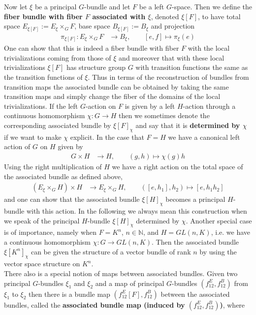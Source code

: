 Now let $\xi$ be a principal $G$-bundle and let $F$ be a left $G$-space. Then we define the \textbf{fiber bundle with fiber $F$ associated with $\xi$}, denoted $\xi[F]$, to have total space $E_{\xi[F]} := E_{\xi} \times_{G} F$, base space $B_{\xi[F]} := B_{\xi}$ and projection
\begin{align*}
  \pi_{\xi[F]}
  \colon
  E_{\xi} \times_{G} F
  &\to
  B_{\xi}
  ,\qquad
  [e,f]
  \mapsto
  \pi_{\xi}(e)
\end{align*}
One can show that this is indeed a fiber bundle with fiber $F$ with the local trivializations coming from those of $\xi$ and moreover that with these local trivializations $\xi[F]$ has structure group $G$ with transition functions the same as the transition functions of $\xi$. Thus in terms of the reconstruction of bundles from transition maps the associated bundle can be obtained by taking the same transition maps and simply change the fiber of the domains of the local trivializations. If the left $G$-action on $F$ is given by a left $H$-action through a continuous homomorphism $\chi \colon G \to H$ then we sometimes denote the corresponding associated bundle by $\xi[F]_{\chi}$ and say that it is \textbf{determined by $\chi$} if we want to make $\chi$ explicit. In the case that $F = H$ we have a canonical left action of $G$ on $H$ given by
\begin{align*}
  G \times H
  &\to
  H
  ,\qquad
  (g,h)
  \mapsto
  \chi(g)h
\end{align*}
Using the right multiplication of $H$ we have a right action on the total space of the associated bundle as defined above,
\begin{align*}
  (E_{\xi}  \times_{G} H)
  \times
  H
  &\to
  E_{\xi}  \times_{G} H
  ,\qquad
  ([e,h_{1}],h_{2})
  \mapsto
  [e,h_{1}h_{2}]
\end{align*}
and one can show that the associated bundle $\xi[H]_{\chi}$ becomes a principal $H$-bundle with this action. In the following we always mean this construction when we speak of the principal $H$-bundle $\xi[H]_{\chi}$ determined by $\chi$. Another special case is of importance, namely when $F = K^{n}$, $n \in \mathbb{N}$, and $H = GL(n,K)$, i.e. we have a continuous homomorphism $\chi \colon G \to GL(n,K)$. Then the associated bundle $\xi[K^{n}]_{\chi}$ can be given the structure of a vector bundle of rank $n$ by using the vector space structure on $K^{n}$.
\\
There also is a special notion of maps between associated bundles. Given two principal $G$-bundles $\xi_{1}$ and $\xi_{2}$ and a map of principal $G$-bundles $(f_{12}^{E},f_{12}^{B})$ from $\xi_{1}$ to $\xi_{2}$ then there is a bundle map $(f_{12}^{E}[F],f_{12}^{B})$ between the associated bundles, called the \textbf{associated bundle map (induced by $(f_{12}^{E},f_{12}^{B})$)}, where
